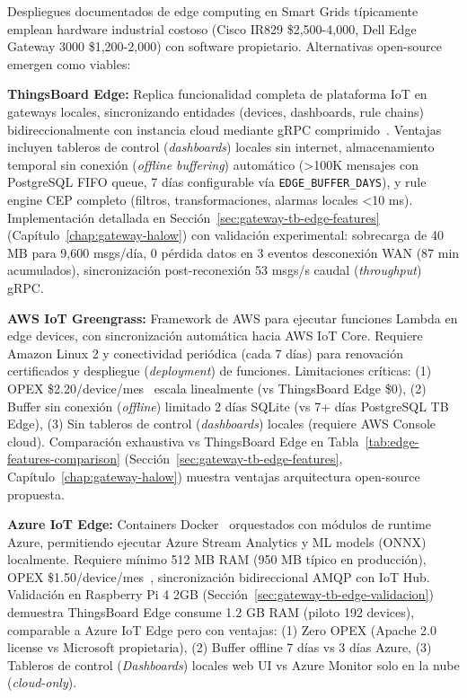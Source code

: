 Despliegues documentados de edge computing en Smart Grids típicamente emplean hardware industrial costoso (Cisco IR829 \$2,500-4,000, Dell Edge Gateway 3000 \$1,200-2,000) con software propietario. Alternativas open-source emergen como viables:

\textbf{ThingsBoard Edge:} Replica funcionalidad completa de plataforma IoT en gateways locales, sincronizando entidades (devices, dashboards, rule chains) bidireccionalmente con instancia cloud mediante gRPC comprimido~\cite{gartnerMagicQuadrantIoT2024,thingsboardEdgeArchitecture2024}. Ventajas incluyen tableros de control (\textit{dashboards}) locales sin internet, almacenamiento temporal sin conexión (\textit{offline buffering}) automático (>100K mensajes con PostgreSQL FIFO queue, 7 días configurable vía \texttt{EDGE\_BUFFER\_DAYS}), y rule engine CEP completo (filtros, transformaciones, alarmas locales <10 ms). Implementación detallada en Sección~\ref{sec:gateway-tb-edge-features} (Capítulo~\ref{chap:gateway-halow}) con validación experimental: sobrecarga de 40 MB para 9,600 msgs/día, 0 pérdida datos en 3 eventos desconexión WAN (87 min acumulados), sincronización post-reconexión 53 msgs/s caudal (\textit{throughput}) gRPC.

\textbf{AWS IoT Greengrass:} Framework de AWS para ejecutar funciones Lambda en edge devices, con sincronización automática hacia AWS IoT Core. Requiere Amazon Linux 2 y conectividad periódica (cada 7 días) para renovación certificados y despliegue (\textit{deployment}) de funciones. Limitaciones críticas: (1) OPEX \$2.20/device/mes~\cite{awsGreengrassPricing2024} escala linealmente (vs ThingsBoard Edge \$0), (2) Buffer sin conexión (\textit{offline}) limitado 2 días SQLite (vs 7+ días PostgreSQL TB Edge), (3) Sin tableros de control (\textit{dashboards}) locales (requiere AWS Console cloud). Comparación exhaustiva vs ThingsBoard Edge en Tabla~\ref{tab:edge-features-comparison} (Sección~\ref{sec:gateway-tb-edge-features}, Capítulo~\ref{chap:gateway-halow}) muestra ventajas arquitectura open-source propuesta.

\textbf{Azure IoT Edge:} Containers Docker~\cite{merkelDockerLightweightLinux2014} orquestados con módulos de runtime Azure, permitiendo ejecutar Azure Stream Analytics y ML models (ONNX) localmente. Requiere mínimo 512 MB RAM (950 MB típico en producción), OPEX \$1.50/device/mes~\cite{azureIoTEdgePricing2024}, sincronización bidireccional AMQP con IoT Hub. Validación en Raspberry Pi 4 2GB (Sección~\ref{sec:gateway-tb-edge-validacion}) demuestra ThingsBoard Edge consume 1.2 GB RAM (piloto 192 devices), comparable a Azure IoT Edge pero con ventajas: (1) Zero OPEX (Apache 2.0 license vs Microsoft propietaria), (2) Buffer offline 7 días vs 3 días Azure, (3) Tableros de control (\textit{Dashboards}) locales web UI vs Azure Monitor solo en la nube (\textit{cloud-only}).

